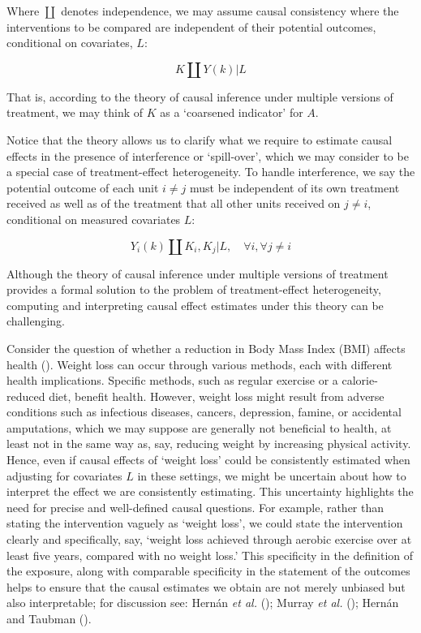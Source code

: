 \documentclass[
  single column]{article}
\begin{document}
Where \(\coprod\) denotes independence, we may assume causal consistency
where the interventions to be compared are independent of their
potential outcomes, conditional on covariates, \(L\):

\[
K \coprod Y(k) | L
\]

That is, according to the theory of causal inference under multiple
versions of treatment, we may think of \(K\) as a `coarsened indicator'
for \(A\).

Notice that the theory allows us to clarify what we require to estimate
causal effects in the presence of interference or `spill-over', which we
may consider to be a special case of treatment-effect heterogeneity. To
handle interference, we say the potential outcome of each unit
\(i \neq j\) must be independent of its own treatment received as well
as of the treatment that all other units received on \(j \neq i\),
conditional on measured covariates \(L\):

\[
Y_i(k) \coprod K_i, K_j | L, \quad \forall i, \forall j \neq i
\]

Although the theory of causal inference under multiple versions of
treatment provides a formal solution to the problem of treatment-effect
heterogeneity, computing and interpreting causal effect estimates under
this theory can be challenging.

Consider the question of whether a reduction in Body Mass Index (BMI)
affects health ().
Weight loss can occur through various methods, each with different
health implications. Specific methods, such as regular exercise or a
calorie-reduced diet, benefit health. However, weight loss might result
from adverse conditions such as infectious diseases, cancers,
depression, famine, or accidental amputations, which we may suppose are
generally not beneficial to health, at least not in the same way as,
say, reducing weight by increasing physical activity. Hence, even if
causal effects of `weight loss' could be consistently estimated when
adjusting for covariates \(L\) in these settings, we might be uncertain
about how to interpret the effect we are consistently estimating. This
uncertainty highlights the need for precise and well-defined causal
questions. For example, rather than stating the intervention vaguely as
`weight loss', we could state the intervention clearly and specifically,
say, `weight loss achieved through aerobic exercise over at least five
years, compared with no weight loss.' This specificity in the definition
of the exposure, along with comparable specificity in the statement of
the outcomes helps to ensure that the causal estimates we obtain are not
merely unbiased but also interpretable; for discussion see: Hernán
\emph{et al.} (); Murray \emph{et al.}
(); Hernán and Taubman
().
\end{document}
